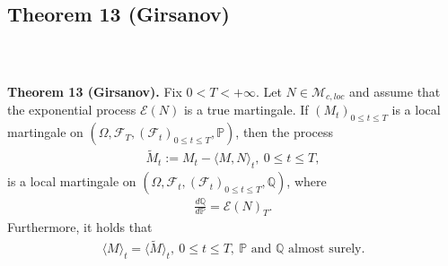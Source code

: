 \documentclass{beamer}
\numberwithin{equation}{section}
\newenvironment{frame2}{\begin{frame}\frametitle{{\normalsize \secname} \\ {\large \subsecname}}}{\end{frame}}
\begin{document}
\subsection{Theorem 13 (Girsanov)}

\begin{frame2}
    \textbf{Theorem 13 (Girsanov).}
    Fix $0 < T < +\infty$.
    Let $N \in \mathcal{M}_{c,loc}$ and assume that the exponential process $\mathcal{E}(N)$ is a true martingale.
    If $(M_t)_{0\leq t\leq T}$ is a local martingale on $(\Omega, \mathcal{F}_T, (\mathcal{F}_t)_{0 \leq t \leq T},\mathbb{P})$, then the process
    \begin{align*}
        \tilde{M}_t := M_t - \langle M, N \rangle_t, \ 0 \leq t \leq T,
    \end{align*}    
    is a local martingale on $(\Omega, \mathcal{F}_t, (\mathcal{F}_t)_{0 \leq t \leq T},\mathbb{Q})$, where
    \begin{align*}
        \frac{d\mathbb{Q}}{d\mathbb{P}} = \mathcal{E}(N)_T.
    \end{align*} 
    Furthermore, it holds that
    \begin{align*}
        \langle M \rangle_t = \langle \tilde{M} \rangle_t, \ 0 \leq t \leq T, \ \text{$\mathbb{P}$ and $\mathbb{Q}$ almost surely}.
    \end{align*}
\end{frame2}

\end{document}

